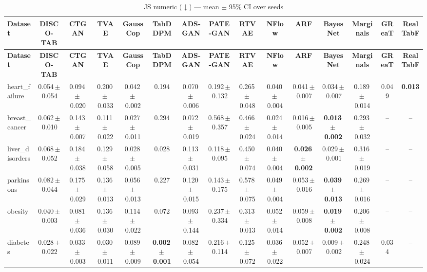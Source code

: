 \documentclass[8pt]{extarticle}
\begin{document}
\begin{longtable}{l*{14}{c}}
\caption{JS numeric ($\downarrow$) --- mean $\pm$ 95\% CI over seeds}\\
\toprule
\textbf{Dataset} & \textbf{DISCO-TAB} & \textbf{CTGAN} & \textbf{TVAE} & \textbf{GaussCop} & \textbf{TabDDPM} & \textbf{ADS-GAN} & \textbf{PATE-GAN} & \textbf{RTVAE} & \textbf{NFlow} & \textbf{ARF} & \textbf{BayesNet} & \textbf{Marginals} & \textbf{GReaT} & \textbf{RealTabF} \\
\midrule
\endfirsthead
\toprule
\textbf{Dataset} & \textbf{DISCO-TAB} & \textbf{CTGAN} & \textbf{TVAE} & \textbf{GaussCop} & \textbf{TabDDPM} & \textbf{ADS-GAN} & \textbf{PATE-GAN} & \textbf{RTVAE} & \textbf{NFlow} & \textbf{ARF} & \textbf{BayesNet} & \textbf{Marginals} & \textbf{GReaT} & \textbf{RealTabF} \\
\midrule
\endhead
\bottomrule
\endfoot
heart\_failure & 0.054\,$\pm$\,0.054 & 0.094\,$\pm$\,0.020 & 0.200\,$\pm$\,0.033 & 0.042\,$\pm$\,0.002 & 0.194 & 0.070\,$\pm$\,0.006 & 0.192\,$\pm$\,0.132 & 0.265\,$\pm$\,0.048 & 0.040\,$\pm$\,0.004 & 0.041\,$\pm$\,0.007 & 0.034\,$\pm$\,0.007 & 0.189\,$\pm$\,0.014 & 0.049 & \textbf{0.013} \\
breast\_cancer & 0.062\,$\pm$\,0.010 & 0.143\,$\pm$\,0.007 & 0.111\,$\pm$\,0.022 & 0.027\,$\pm$\,0.011 & 0.294 & 0.072\,$\pm$\,0.019 & 0.568\,$\pm$\,0.357 & 0.466\,$\pm$\,0.024 & 0.024\,$\pm$\,0.014 & 0.016\,$\pm$\,0.005 & \textbf{0.013\,$\pm$\,0.002} & 0.293\,$\pm$\,0.032 & -- & -- \\
liver\_disorders & 0.068\,$\pm$\,0.052 & 0.184\,$\pm$\,0.038 & 0.129\,$\pm$\,0.058 & 0.028\,$\pm$\,0.005 & 0.028 & 0.113\,$\pm$\,0.031 & 0.118\,$\pm$\,0.095 & 0.450\,$\pm$\,0.074 & 0.040\,$\pm$\,0.004 & \textbf{0.026\,$\pm$\,0.002} & 0.029\,$\pm$\,0.001 & 0.316\,$\pm$\,0.019 & -- & -- \\
parkinsons & 0.082\,$\pm$\,0.044 & 0.175\,$\pm$\,0.029 & 0.136\,$\pm$\,0.013 & 0.056\,$\pm$\,0.013 & 0.227 & 0.120\,$\pm$\,0.015 & 0.143\,$\pm$\,0.175 & 0.578\,$\pm$\,0.075 & 0.049\,$\pm$\,0.004 & 0.053\,$\pm$\,0.016 & \textbf{0.039\,$\pm$\,0.013} & 0.269\,$\pm$\,0.016 & -- & -- \\
obesity & 0.040\,$\pm$\,0.003 & 0.081\,$\pm$\,0.036 & 0.136\,$\pm$\,0.030 & 0.114\,$\pm$\,0.022 & 0.072 & 0.093\,$\pm$\,0.144 & 0.237\,$\pm$\,0.334 & 0.313\,$\pm$\,0.013 & 0.052\,$\pm$\,0.014 & 0.059\,$\pm$\,0.008 & \textbf{0.019\,$\pm$\,0.002} & 0.206\,$\pm$\,0.008 & -- & -- \\
diabetes & 0.028\,$\pm$\,0.022 & 0.033\,$\pm$\,0.003 & 0.030\,$\pm$\,0.011 & 0.089\,$\pm$\,0.009 & \textbf{0.002\,$\pm$\,0.001} & 0.082\,$\pm$\,0.054 & 0.216\,$\pm$\,0.114 & 0.125\,$\pm$\,0.072 & 0.036\,$\pm$\,0.022 & 0.052\,$\pm$\,0.007 & 0.009\,$\pm$\,0.002 & 0.248\,$\pm$\,0.024 & 0.034 & -- \\

\end{longtable}
\end{document}
